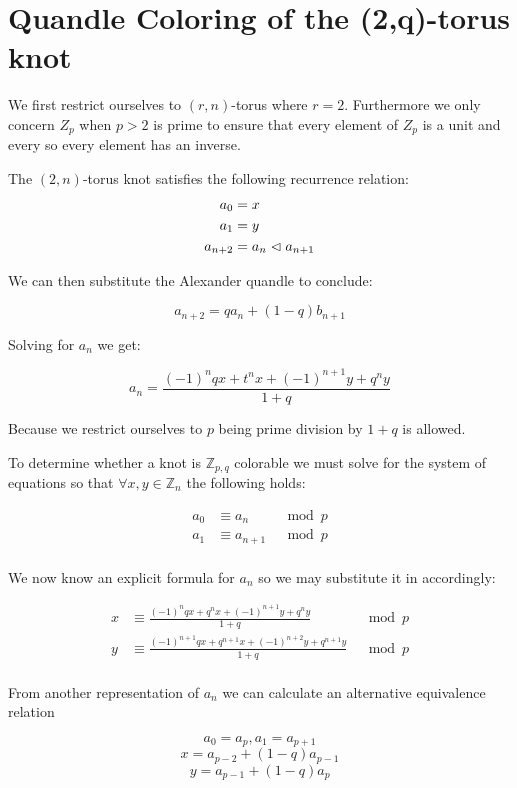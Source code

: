 \documentclass[paper.tex]{subfiles}
\begin{document}
\section{Quandle Coloring of the (2,q)-torus knot}\label{sec:2ntorus}
We first restrict ourselves to $(r,n)$-torus where $r = 2$. Furthermore we only concern $Z_p$ when $p > 2$ is prime to ensure that every element of $Z_p$ is a unit and every so every element has an inverse.

The $(2,n)$-torus knot satisfies the following recurrence relation:
\begin{align*}
	a_0 &= x \\
	a_1 &= y \\
	a_{n+2} &= a_{n} \vartriangleleft a_{n+1} \\
\end{align*}

We can then substitute the Alexander quandle to conclude:

$$ a_{n+2} = qa_{n} + (1-q)b_{n+1} $$

Solving for $a_n$ we get:

$$ a_n = \frac{(-1)^nqx+t^nx+(-1)^{n+1}y+q^ny}{1+q} $$

Because we restrict ourselves to $p$ being prime division by $1+q$ is allowed.

To determine whether a knot is $\mathbb{Z}_{p,q}$ colorable we must solve for the system of equations so that $\forall x,y \in \mathbb{Z}_n$ the following holds:

\begin{align*}
	a_0 &\equiv a_{n}  & \mod{p} \\
	a_1 &\equiv a_{n+1} & \mod{p} \\
\end{align*}

We now know an explicit formula for $a_n$ so we may substitute it in accordingly:

\begin{align*}
	x &\equiv \frac{(-1)^nqx+q^nx+(-1)^{n+1}y+q^ny}{1+q} & \mod{p} \\
	y &\equiv \frac{(-1)^{n+1}qx+q^{n+1}x+(-1)^{n+2}y+q^{n+1}y}{1+q} & \mod{p} \\
\end{align*}

From another representation of $a_{n}$ we can calculate an alternative equivalence relation

$$a_{0} = a_{p}, a_{1} = a_{p+1}$$
$$x = a_{p-2} + (1-q)a_{p-1}$$
$$ y = a_{p-1} + (1-q)a_{p}$$
\end{document}
